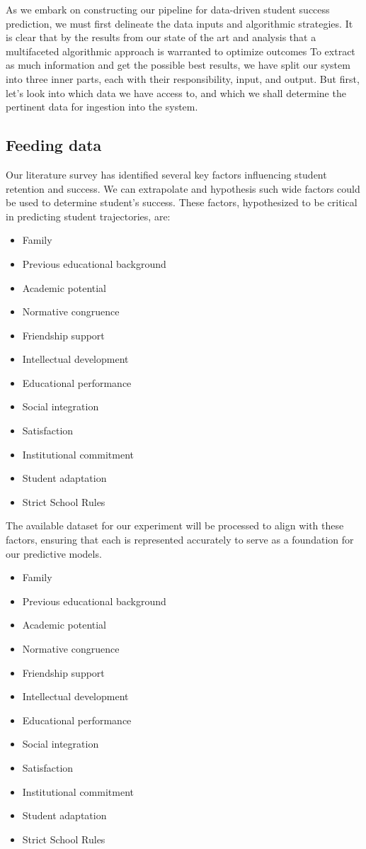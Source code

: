 \documentclass[../main.tex]{subfiles}
\begin{document}
As we embark on constructing our pipeline for data-driven student success prediction, we must first delineate the data inputs and algorithmic strategies. 
It is clear that by the results from our state of the art and analysis that a multifaceted algorithmic approach is warranted to optimize outcomes
To extract as much information and get the possible best results, we have split our system into three inner parts, each with their responsibility, input, and output.
But first, let's look into which data we have access to, and which we shall determine the pertinent data for ingestion into the system.

\subsection{Feeding data}
\label{subsec:conprop_feedingdata}
Our literature survey has identified several key factors influencing student retention and success. We can extrapolate and hypothesis such wide factors could be used to determine student's success.
These factors, hypothesized to be critical in predicting student trajectories, are:

\begin{itemize}
    \item Family
    \item Previous educational background
    \item Academic potential
    \item Normative congruence
    \item Friendship support
    \item Intellectual development
    \item Educational performance
    \item Social integration
    \item Satisfaction
    \item Institutional commitment
    \item Student adaptation
    \item Strict School Rules
\end{itemize}

The available dataset for our experiment will be processed to align with these factors, ensuring that each is represented accurately to serve as a foundation for our predictive models.
\begin{itemize}
    \item Family
    \item Previous educational background
    \item Academic potential
    \item Normative congruence
    \item Friendship support
    \item Intellectual development
    \item Educational performance
    \item Social integration
    \item Satisfaction
    \item Institutional commitment
    \item Student adaptation
    \item Strict School Rules
\end{itemize}
\end{document}
